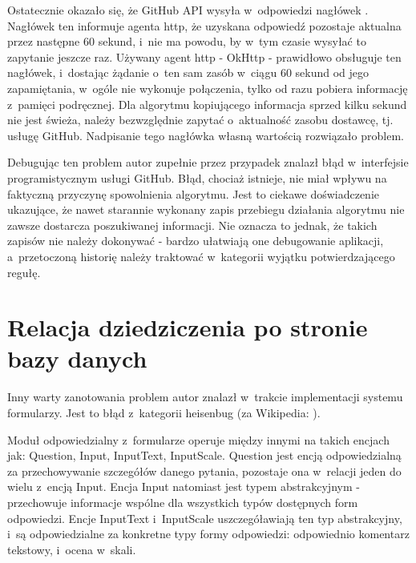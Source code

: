 \medskip
Ostatecznie okazało się, że GitHub API wysyła w~odpowiedzi nagłówek . Nagłówek ten informuje agenta http, że uzyskana odpowiedź pozostaje aktualna przez następne 60 sekund, i~nie ma powodu, by w~tym czasie wysyłać to zapytanie jeszcze raz. Używany agent http - OkHttp - prawidłowo obsługuje ten nagłówek, i~dostając żądanie o~ten sam zasób w~ciągu 60 sekund od jego zapamiętania, w~ogóle nie wykonuje połączenia, tylko od razu pobiera informację z~pamięci podręcznej. Dla algorytmu kopiującego informacja sprzed kilku sekund nie jest świeża, należy bezwzględnie zapytać o~aktualność zasobu dostawcę, tj. usługę GitHub. Nadpisanie tego nagłówka własną wartością rozwiązało problem.

\medskip
Debugując ten problem autor zupełnie przez przypadek znalazł błąd w~interfejsie programistycznym usługi GitHub. Błąd, chociaż istnieje, nie miał wpływu na faktyczną przyczynę spowolnienia algorytmu. Jest to ciekawe doświadczenie ukazujące, że nawet starannie wykonany zapis przebiegu działania algorytmu nie zawsze dostarcza poszukiwanej informacji. Nie oznacza to jednak, że takich zapisów nie należy dokonywać - bardzo ułatwiają one debugowanie aplikacji, a~przetoczoną historię należy traktować w~kategorii wyjątku potwierdzającego regułę.

\section{Relacja dziedziczenia po stronie bazy danych}
Inny warty zanotowania problem autor znalazł w~trakcie implementacji systemu formularzy. Jest to błąd z~kategorii heisenbug (za Wikipedia:  \cite{Heisenbug}).

\medskip
Moduł odpowiedzialny z~formularze operuje między innymi na takich encjach jak: Question, Input, InputText, InputScale. Question jest encją odpowiedzialną za przechowywanie szczegółów danego pytania, pozostaje ona w~relacji jeden do wielu z~encją Input. Encja Input natomiast jest typem abstrakcyjnym - przechowuje informacje wspólne dla wszystkich typów dostępnych form odpowiedzi. Encje InputText i~InputScale uszczegóławiają ten typ abstrakcyjny, i~są odpowiedzialne za konkretne typy formy odpowiedzi: odpowiednio komentarz tekstowy, i~ocena w~skali.

